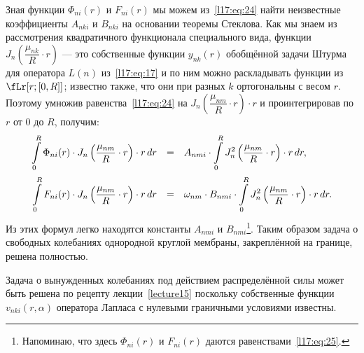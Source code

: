 Зная функции $\Phi_{ni}(r)$ и $F_{ni}(r)$ мы можем из~\eqref{l17:eq:24} найти неизвестные коэффициенты $A_{nki}$ и $B_{nki}$ на основании теоремы Стеклова. Как мы знаем из рассмотрения квадратичного функционала специального вида, функции $J_n\left(\dfrac{\mu_{nk}}{R}\cdot r\right)$ --- это собственные функции $y_{nk}(r)$ обобщённой задачи Штурма для оператора $L(n)$ из~\eqref{l17:eq:17} и по ним можно раскладывать функции из $\fLr[r;{[0,R]}]$; известно также, что они при разных $k$ ортогональны с весом $r$. Поэтому умножив равенства~\eqref{l17:eq:24} на $J_n\left(\dfrac{\mu_{nm}}{R}\cdot r\right)\cdot r$ и проинтегрировав по $r$ от $0$ до $R$, получим:
\begin{equation*}
	\hfill\begin{array}{rcl}
		\displaystyle\int\limits_{0}^{R}\Phi_{ni}(r)\cdot J_{n}\left(\frac{\mu_{nm}}{R}\cdot r\right)\cdot r\,dr&=&\displaystyle A_{nmi}\cdot\int\limits_{0}^{R}J_{n}^2\left(\frac{\mu_{nm}}{R}\cdot r\right)\cdot r\,dr,\\[18pt]
		\displaystyle \int\limits_{0}^{R}F_{ni}(r)\cdot J_{n}\left(\frac{\mu_{nm}}{R}\cdot r\right)\cdot r\,dr&=&\displaystyle\omega_{nm}\cdot B_{nmi}\cdot\int\limits_{0}^{R}J_{n}^2\left(\frac{\mu_{nm}}{R}\cdot r\right)\cdot r\,dr.
	\end{array}\hfill
\end{equation*} 
Из этих формул легко находятся константы $A_{nmi}$ и $B_{nmi}$\footnote{Напоминаю, что здесь $\Phi_{ni}(r)$ и $F_{ni}(r)$ даются равенствами~\eqref{l17:eq:25}.}. Таким образом задача о свободных колебаниях однородной круглой мембраны, закреплённой на границе, решена полностью.

Задача о вынужденных колебаниях под действием распределённой силы может быть решена по рецепту лекции~\ref{lecture15} поскольку собственные функции $v_{nki}(r,\alpha)$ оператора Лапласа с нулевыми граничными условиями известны.

